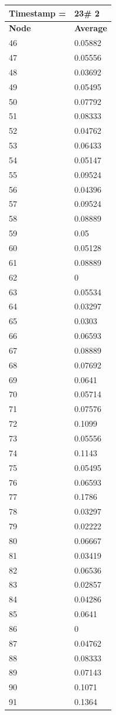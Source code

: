 \begin{tabular}{|l||l|}
\hline
\textbf{Timestamp =} & \textbf{23}\# 2\\\hline
	\textbf{Node} & \textbf{Average} \\ \hline
\hline
	46 & 0.05882 \\ \hline
	47 & 0.05556 \\ \hline
	48 & 0.03692 \\ \hline
	49 & 0.05495 \\ \hline
	50 & 0.07792 \\ \hline
	51 & 0.08333 \\ \hline
	52 & 0.04762 \\ \hline
	53 & 0.06433 \\ \hline
	54 & 0.05147 \\ \hline
	55 & 0.09524 \\ \hline
	56 & 0.04396 \\ \hline
	57 & 0.09524 \\ \hline
	58 & 0.08889 \\ \hline
	59 & 0.05 \\ \hline
	60 & 0.05128 \\ \hline
	61 & 0.08889 \\ \hline
	62 & 0 \\ \hline
	63 & 0.05534 \\ \hline
	64 & 0.03297 \\ \hline
	65 & 0.0303 \\ \hline
	66 & 0.06593 \\ \hline
	67 & 0.08889 \\ \hline
	68 & 0.07692 \\ \hline
	69 & 0.0641 \\ \hline
	70 & 0.05714 \\ \hline
	71 & 0.07576 \\ \hline
	72 & 0.1099 \\ \hline
	73 & 0.05556 \\ \hline
	74 & 0.1143 \\ \hline
	75 & 0.05495 \\ \hline
	76 & 0.06593 \\ \hline
	77 & 0.1786 \\ \hline
	78 & 0.03297 \\ \hline
	79 & 0.02222 \\ \hline
	80 & 0.06667 \\ \hline
	81 & 0.03419 \\ \hline
	82 & 0.06536 \\ \hline
	83 & 0.02857 \\ \hline
	84 & 0.04286 \\ \hline
	85 & 0.0641 \\ \hline
	86 & 0 \\ \hline
	87 & 0.04762 \\ \hline
	88 & 0.08333 \\ \hline
	89 & 0.07143 \\ \hline
	90 & 0.1071 \\ \hline
	91 & 0.1364 \\ \hline
\end{tabular}
